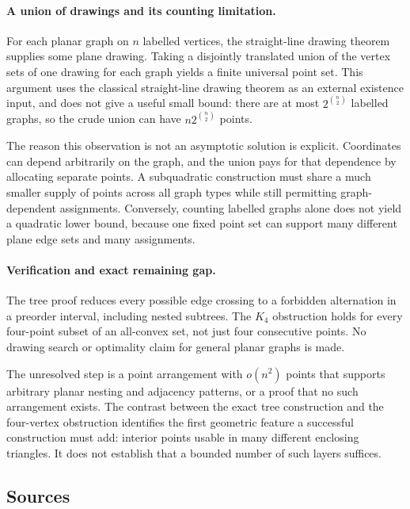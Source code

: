 \documentclass[11pt,a4paper]{article}
\begin{document}
\paragraph{A union of drawings and its counting limitation.}
For each planar graph on $n$ labelled vertices, the straight-line drawing theorem supplies some plane drawing. Taking a disjointly translated union of the vertex sets of one drawing for each graph yields a finite universal point set. This argument uses the classical straight-line drawing theorem as an external existence input, and does not give a useful small bound: there are at most $2^{\binom n2}$ labelled graphs, so the crude union can have $n2^{\binom n2}$ points.

The reason this observation is not an asymptotic solution is explicit. Coordinates can depend arbitrarily on the graph, and the union pays for that dependence by allocating separate points. A subquadratic construction must share a much smaller supply of points across all graph types while still permitting graph-dependent assignments. Conversely, counting labelled graphs alone does not yield a quadratic lower bound, because one fixed point set can support many different plane edge sets and many assignments.

\paragraph{Verification and exact remaining gap.}
The tree proof reduces every possible edge crossing to a forbidden alternation in a preorder interval, including nested subtrees. The $K_4$ obstruction holds for every four-point subset of an all-convex set, not just four consecutive points. No drawing search or optimality claim for general planar graphs is made.

The unresolved step is a point arrangement with $o(n^2)$ points that supports arbitrary planar nesting and adjacency patterns, or a proof that no such arrangement exists. The contrast between the exact tree construction and the four-vertex obstruction identifies the first geometric feature a successful construction must add: interior points usable in many different enclosing triangles. It does not establish that a bounded number of such layers suffices.

\subsection{Sources}
\end{document}
